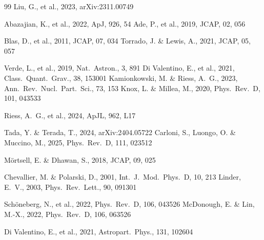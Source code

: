 \documentclass[a4paper,11pt]{article}
\begin{document}
\begin{thebibliography}{99}
 Liu, G., et al., 2023, arXiv:2311.00749

 Abazajian, K., et al., 2022, ApJ, 926, 54
 Ade, P., et al., 2019, JCAP, 02, 056

 Blas, D., et al., 2011, JCAP, 07, 034
 Torrado, J. \& Lewis, A., 2021, JCAP, 05, 057

 Verde, L., et al., 2019, Nat.\ Astron., 3, 891
 Di Valentino, E., et al., 2021, Class.\ Quant.\ Grav., 38, 153001
 Kamionkowski, M. \& Riess, A.~G., 2023, Ann.\ Rev.\ Nucl.\ Part.\ Sci., 73, 153
 Knox, L. \& Millea, M., 2020, Phys.\ Rev.\ D, 101, 043533

 Riess, A.~G., et al., 2024, ApJL, 962, L17

 Tada, Y. \& Terada, T., 2024, arXiv:2404.05722
 Carloni, S., Luongo, O. \& Muccino, M., 2025, Phys.\ Rev.\ D, 111, 023512

 M\"{o}rtsell, E. \& Dhawan, S., 2018, JCAP, 09, 025

 Chevallier, M. \& Polarski, D., 2001, Int.\ J.\ Mod.\ Phys.\ D, 10, 213
 Linder, E.~V., 2003, Phys.\ Rev.\ Lett., 90, 091301

 Sch\"{o}neberg, N., et al., 2022, Phys.\ Rev.\ D, 106, 043526
 McDonough, E. \& Lin, M.-X., 2022, Phys.\ Rev.\ D, 106, 063526

 Di Valentino, E., et al., 2021, Astropart.\ Phys., 131, 102604

\end{thebibliography}
\end{document}
